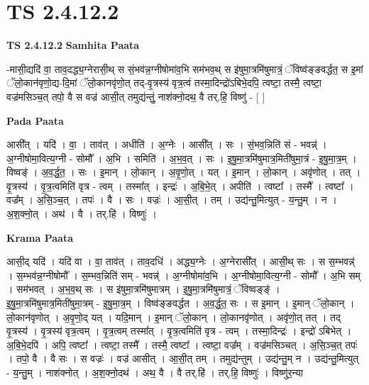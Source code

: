 \documentclass[17pt]{extarticle}
\begin{document}
\section*{ TS 2.4.12.2 }

\textbf{TS 2.4.12.2 } \newline
\textbf{Samhita Paata} \newline

-मासी॒द्यदि॑ वा॒ ताव॒दद्ध्य॒ग्नेरासी॒थ् स सं॒भव॑न्न॒ग्नीषोमा॑व॒भि सम॑भव॒थ् स इ॑षुमा॒त्रमि॑षुमात्रं॒ ॅविष्व॑ङ्ङवर्द्धत॒ स इ॒मां ॅलो॒कान॑वृणो॒द्य-दि॒मां ॅलो॒कानवृ॑णो॒त् तद्-वृ॒त्रस्य॑ वृत्र॒त्वं तस्मा॒दिन्द्रो॑ऽबिभे॒दपि॒ त्वष्टा॒ तस्मै॒ त्वष्टा॒ वज्र॑मसिञ्च॒त् तपो॒ वै स वज्र॑ आसी॒त् तमुद्य॑न्तुं॒ नाश॑क्नो॒दथ॒ वै तर्.हि॒ विष्णु॑ - [  ] \newline

\textbf{Pada Paata} \newline

आसी᳚त् । यदि॑ । वा॒ । ताव॑त् । अधीति॑ । अ॒ग्नेः । आसी᳚त् ।   सः । सं॒भव॒न्निति॑ सं - भवन्न्॑ । अ॒ग्नीषोमा॒वित्य॒ग्नी - सोमौ᳚ । अ॒भि । समिति॑ । अ॒भ॒व॒त् । सः । इ॒षु॒मा॒त्रमि॑षुमात्र॒मिती॑षुमा॒त्रं - इ॒षु॒मा॒त्र॒म् । विष्वङ्॑ । अ॒व॒र्द्ध॒त॒ । सः । इ॒मान् । लो॒कान् । अ॒वृ॒णो॒त् । यत् । इ॒मान् । लो॒कान् । अवृ॑णोत् । तत् । वृ॒त्रस्य॑ । वृ॒त्र॒त्वमिति॑ वृत्र - त्वम् । तस्मा᳚त् । इन्द्रः॑ । अ॒बि॒भे॒त् । अपीति॑ । त्वष्टा᳚ । तस्मै᳚ । त्वष्टा᳚ । वज्र᳚म् । अ॒सि॒ञ्च॒त् । तपः॑ । वै । सः । वज्रः॑ । आ॒सी॒त् । तम् । उद्य॑न्तु॒मित्युत् -   य॒न्तु॒म् । न । अ॒श॒क्नो॒त् । अथ॑ । वै । तर्.हि॑ । विष्णुः॑ ।  \newline


\textbf{Krama Paata} \newline

आसी॒द् यदि॑ । यदि॑ वा । वा॒ ताव॑त् । ताव॒दधि॑ । अद्ध्य॒ग्नेः । अ॒ग्नेरासी᳚त् । आसी॒थ् सः । स स॒म्भवन्न्॑ । स॒म्भव॑न्न॒ग्नीषोमौ᳚ । स॒म्भव॒न्निति॑ सम् - भवन्न्॑ । अ॒ग्नीषोमा॑व॒भि । अ॒ग्नीषोमा॒वित्य॒ग्नी - सोमौ᳚ । अ॒भि सम् । सम॑भवत् । अ॒भ॒व॒थ् सः । स इ॑षुमा॒त्रमि॑षुमात्रम् । इ॒षु॒मा॒त्रमि॑षुमात्रं॒ ॅविष्वङ्ङ्॑ । इ॒षु॒मा॒त्रमि॑षुमात्र॒मिती॑षुमा॒त्रम् - इ॒षु॒मा॒त्र॒म् । विष्व॑ङ्ङवर्द्धत । अ॒व॒र्द्ध॒त॒ सः । स इ॒मान् । इ॒मान् ॅलो॒कान् । लो॒कान॑वृणोत् । अ॒वृ॒णो॒द् यत् । यदि॒मान् । इ॒मान् ॅलो॒कान् । लो॒कानवृ॑णोत् । अवृ॑णो॒त् तत् । तद् वृ॒त्रस्य॑ । वृ॒त्रस्य॑ वृत्र॒त्वम् । वृ॒त्र॒त्वम् तस्मा᳚त् । वृ॒त्र॒त्वमिति॑ वृत्र - त्वम् । तस्मा॒दिन्द्रः॑ । इन्द्रो॑ ऽबिभेत् । अ॒बि॒भे॒दपि॑ । अपि॒ त्वष्टा᳚ । त्वष्टा॒ तस्मै᳚ । तस्मै॒ त्वष्टा᳚ । त्वष्टा॒ वज्र᳚म् । वज्र॑मसिञ्चत् । अ॒सि॒ञ्च॒त् तपः॑ । तपो॒ वै । वै सः । स वज्रः॑ । वज्र॑ आसीत् । आ॒सी॒त् तम् । तमुद्य॑न्तुम् । उद्य॑न्तु॒म् न । उद्य॑न्तु॒मित्युत् - य॒न्तु॒म् । नाश॑क्नोत् । अ॒श॒क्नो॒दथ॑ । अथ॒ वै । वै तर्.हि॑ । तर्.हि॒ विष्णुः॑ । विष्णु॑र॒न्या \newline
\end{document}

